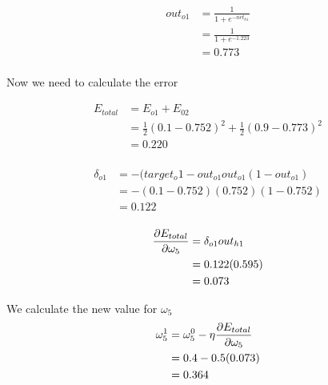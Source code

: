 \documentclass[10pt,a4paper]{article}
\begin{document}
\begin{equation}
\begin{split}
out_{o1} &= \frac{1}{1+e^{-net_{h1}}}\\ 
         &= \frac{1}{1+e^{-1.223}}\\ 
         &= 0.773\\
\end{split}
\end{equation}

Now we need to calculate the error

\begin{equation}
\begin{split}
E_{total} &= E_{o1} + E_{02} \\
          &= \frac{1}{2}(0.1-0.752)^2 + \frac{1}{2}(0.9 - 0.773)^2 \\
          &= 0.220 \\
\end{split}
\end{equation}

\begin{equation}
\begin{split}
\delta_{o1} &= -(target_o1 -out_{o1}out_{o1}(1-out_{o1})\\
            &= -(0.1-0.752)(0.752)(1-0.752)\\
            &= 0.122\\
\end{split}
\end{equation}

\begin{equation}
\begin{split}
\pdv{E_{total}}{\omega_5} &= \delta_{o1}out_{h1}\\
                          &= 0.122(0.595)\\
                          &= 0.073\\
\end{split}
\end{equation}

We calculate the new value for $\omega_5$
\begin{equation}
\begin{split}
\omega_5^1 &= \omega_5^0 - \eta\pdv{E_{total}}{\omega_5}\\
           &= 0.4 -0.5(0.073)\\
           &= 0.364\\
\end{split}
\end{equation}
\end{document}
